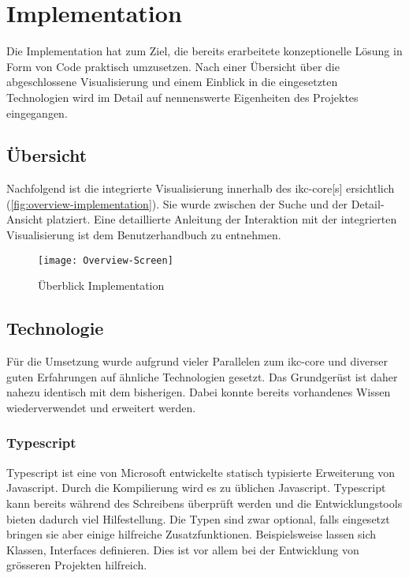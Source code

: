 \chapter{Implementation} \label{implementation}

Die Implementation hat zum Ziel, die bereits erarbeitete konzeptionelle Lösung in Form von Code praktisch umzusetzen. Nach einer Übersicht über die abgeschlossene Visualisierung und einem Einblick in die eingesetzten Technologien wird im Detail auf nennenswerte Eigenheiten des Projektes eingegangen.

\section{Übersicht}
Nachfolgend ist die integrierte Visualisierung innerhalb des \gls{ikc-core}[s] ersichtlich (\autoref{fig:overview-implementation}). Sie wurde zwischen der Suche und der Detail-Ansicht platziert. Eine detaillierte Anleitung der Interaktion mit der integrierten Visualisierung ist dem Benutzerhandbuch zu entnehmen. 

\begin{figure}[htbp]
\centerline{\texttt{[image: Overview-Screen]}}
\caption {Überblick Implementation}
\label{fig:overview-implementation}
\end{figure}

\section{Technologie} \label{sec:technologie}

Für die Umsetzung wurde aufgrund vieler Parallelen zum \gls{ikc-core} und diverser guten Erfahrungen auf ähnliche Technologien gesetzt. Das Grundgerüst ist daher nahezu identisch mit dem bisherigen. Dabei konnte bereits vorhandenes Wissen wiederverwendet und erweitert werden.

\subsection{Typescript}\label{typescript}

Typescript ist eine von Microsoft entwickelte statisch typisierte Erweiterung von Javascript. Durch die Kompilierung wird es zu üblichen Javascript. Typescript kann bereits während des Schreibens überprüft werden und die Entwicklungstools bieten dadurch viel Hilfestellung. Die Typen sind zwar optional, falls eingesetzt bringen sie aber einige hilfreiche Zusatzfunktionen. Beispielsweise lassen sich Klassen, Interfaces definieren. Dies ist vor allem bei der Entwicklung von grösseren Projekten hilfreich. \citep{typescriptlang}

